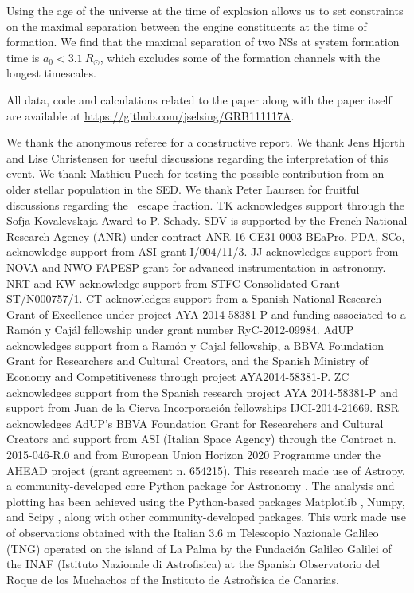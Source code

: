 \documentclass{aa}    %
\begin{document}
Using the age of the universe at the time of explosion allows us to set
constraints on the maximal separation between the engine constituents at the
time of formation. We find that the maximal separation of two NSs at system
formation time is $a_0 < 3.1~R_\odot$, which excludes some of the formation
channels with the longest timescales.

All data, code and calculations related to the paper along with the
paper itself are available at \url{https://github.com/jselsing/GRB111117A}.

\begin{acknowledgements}
We thank the anonymous referee for a constructive report. 
%
We thank Jens Hjorth and Lise Christensen for useful discussions regarding the interpretation of this event. We thank Mathieu Puech for testing the possible contribution from an older stellar population in the SED. We thank Peter Laursen for fruitful discussions regarding the \lya~escape fraction.
%	
TK acknowledges support through the Sofja Kovalevskaja Award to P. Schady.
%
SDV is supported by the French National Research Agency (ANR) under contract ANR-16-CE31-0003 BEaPro.
%
PDA, SCo, acknowledge support from ASI grant I/004/11/3.
%
JJ acknowledges support from NOVA and NWO-FAPESP grant for advanced
instrumentation in astronomy.
%
NRT and KW acknowledge support from STFC Consolidated
Grant ST/N000757/1.
%
CT acknowledges support from a Spanish National Research Grant of Excellence
under project AYA 2014-58381-P and funding associated to a Ramón y Cajál
fellowship under grant number RyC-2012-09984.
%
AdUP acknowledges support from a Ramón y Cajal fellowship, a BBVA Foundation
Grant for Researchers and Cultural Creators, and the Spanish Ministry of Economy
and Competitiveness through project AYA2014-58381-P.
%
ZC acknowledges support from the Spanish research project AYA 2014-58381-P and
support from Juan de la Cierva Incorporaci\'on fellowships IJCI-2014-21669.
%
RSR acknowledges AdUP's BBVA Foundation Grant for Researchers and Cultural
Creators and support from ASI (Italian Space Agency) through the Contract n. 2015-046-R.0 and from European Union Horizon 2020 Programme under the AHEAD project (grant agreement n. 654215).
%
This research made use of Astropy, a community-developed core Python package for Astronomy \citep{TheAstropyCollaboration2013}. The analysis and plotting has been achieved using the Python-based packages Matplotlib \citep{Hunter2007}, Numpy, and Scipy \citep{VanderWalt2011}, along with other community-developed packages.
%
This work made use of observations obtained with the Italian 3.6 m Telescopio Nazionale Galileo (TNG) operated on the island of La Palma by the Fundaci\'on Galileo Galilei of the INAF (Istituto Nazionale di Astrofisica) at the Spanish Observatorio del Roque de los Muchachos of the Instituto de Astrof\'isica de Canarias.

\end{acknowledgements}
\end{document}
